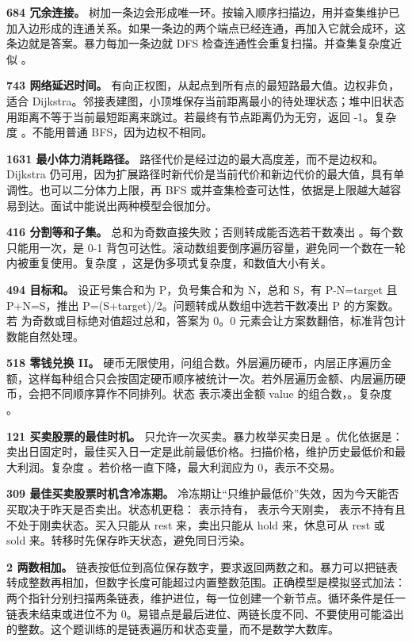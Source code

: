 \textbf{684 冗余连接。} 树加一条边会形成唯一环。按输入顺序扫描边，用并查集维护已加入边形成的连通关系。如果一条边的两个端点已经连通，再加入它就会成环，这条边就是答案。暴力每加一条边就 DFS 检查连通性会重复扫描。并查集复杂度近似 。

\textbf{743 网络延迟时间。} 有向正权图，从起点到所有点的最短路最大值。边权非负，适合 Dijkstra。邻接表建图，小顶堆保存当前距离最小的待处理状态；堆中旧状态用距离不等于当前最短距离来跳过。若最终有节点距离仍为无穷，返回 -1。复杂度 。不能用普通 BFS，因为边权不相同。

\textbf{1631 最小体力消耗路径。} 路径代价是经过边的最大高度差，而不是边权和。Dijkstra 仍可用，因为扩展路径时新代价是当前代价和新边代价的最大值，具有单调性。也可以二分体力上限，再 BFS 或并查集检查可达性，依据是上限越大越容易到达。面试中能说出两种模型会很加分。

\textbf{416 分割等和子集。} 总和为奇数直接失败；否则转成能否选若干数凑出 。每个数只能用一次，是 0-1 背包可达性。滚动数组要倒序遍历容量，避免同一个数在一轮内被重复使用。复杂度 ，这是伪多项式复杂度，和数值大小有关。

\textbf{494 目标和。} 设正号集合和为 P，负号集合和为 N，总和 S，有 P-N=target 且 P+N=S，推出 P=(S+target)/2。问题转成从数组中选若干数凑出 P 的方案数。若  为奇数或目标绝对值超过总和，答案为 0。0 元素会让方案数翻倍，标准背包计数能自然处理。

\textbf{518 零钱兑换 II。} 硬币无限使用，问组合数。外层遍历硬币，内层正序遍历金额，这样每种组合只会按固定硬币顺序被统计一次。若外层遍历金额、内层遍历硬币，会把不同顺序算作不同排列。状态  表示凑出金额 value 的组合数，。复杂度 。

\textbf{121 买卖股票的最佳时机。} 只允许一次买卖。暴力枚举买卖日是 。优化依据是：卖出日固定时，最佳买入日一定是此前最低价格。扫描价格，维护历史最低价和最大利润。复杂度 。若价格一直下降，最大利润应为 0，表示不交易。

\textbf{309 最佳买卖股票时机含冷冻期。} 冷冻期让“只维护最低价”失效，因为今天能否买取决于昨天是否卖出。状态机更稳： 表示持有， 表示今天刚卖， 表示不持有且不处于刚卖状态。买入只能从 rest 来，卖出只能从 hold 来，休息可从 rest 或 sold 来。转移时先保存昨天状态，避免同日污染。

\textbf{2 两数相加。} 链表按低位到高位保存数字，要求返回两数之和。暴力可以把链表转成整数再相加，但数字长度可能超过内置整数范围。正确模型是模拟竖式加法：两个指针分别扫描两条链表，维护进位，每一位创建一个新节点。循环条件是任一链表未结束或进位不为 0。易错点是最后进位、两链长度不同、不要使用可能溢出的整数。这个题训练的是链表遍历和状态变量，而不是数学大数库。

